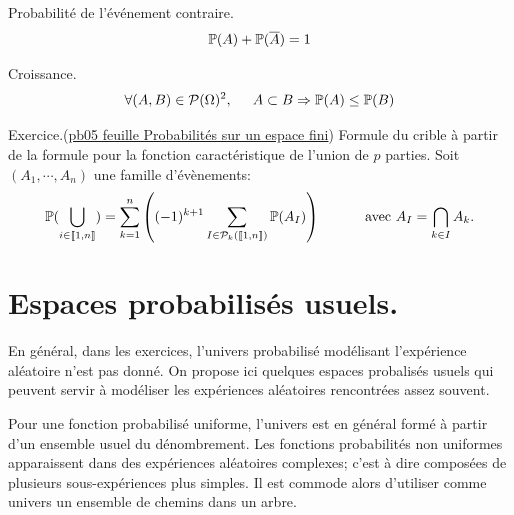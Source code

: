 Probabilité de l'événement contraire.
\begin{displaymath}
 \mathbb{P}(A) + \mathbb{P}(\overline{A}) = 1
\end{displaymath}

Croissance.
\begin{displaymath}
\forall (A,B)\in \mathcal{P}(\Omega)^2, \hspace{0.5cm} A\subset B \Rightarrow \mathbb{P}(A) \leq \mathbb{P}(B) 
\end{displaymath}

Exercice.(\href{\urlexo _fex_pb.pdf}{pb05 feuille Probabilités sur un espace fini}) Formule du crible à partir de la formule pour la fonction caractéristique de l'union de $p$ parties.
Soit $(A_1, \cdots, A_n)$ une famille d'évènements:
\[
 \mathbb{P}(\bigcup_{i \in \llbracket 1, n \rrbracket}) =
 \sum_{k=1}^{n}\left( (-1)^{k+1}\sum_{I \in \mathcal{P}_k(\llbracket 1, n \rrbracket)}\mathbb{P}(A_I)\right) 
 \hspace{1cm} \text{ avec } 
 A_I = \bigcap_{k \in I} A_k .
\]


\section{Espaces probabilisés usuels.}
En général, dans les exercices, l'univers probabilisé modélisant l'expérience aléatoire n'est pas donné. On propose ici quelques espaces probalisés usuels qui peuvent servir à modéliser les expériences aléatoires rencontrées assez souvent.

Pour une fonction probabilisé uniforme, l'univers est en général formé à partir d'un ensemble usuel du dénombrement. Les fonctions probabilités non uniformes apparaissent dans des expériences aléatoires complexes; c'est à dire composées de plusieurs sous-expériences plus simples. Il est commode alors d'utiliser comme univers un ensemble de chemins dans un arbre.

